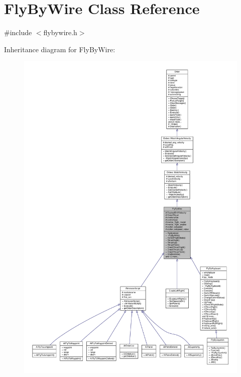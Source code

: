 \hypertarget{classFlyByWire}{}\section{Fly\+By\+Wire Class Reference}
\label{classFlyByWire}


{\ttfamily \#include $<$flybywire.\+h$>$}



Inheritance diagram for Fly\+By\+Wire\+:
\nopagebreak
\begin{figure}[H]
\begin{center}
\leavevmode
\includegraphics[width=350pt]{d4/dde/classFlyByWire__inherit__graph}
\end{center}
\end{figure}


